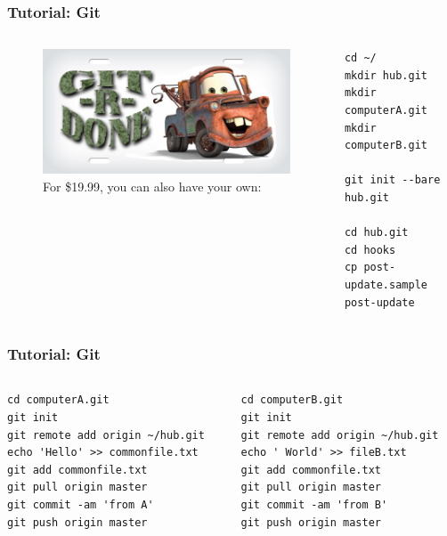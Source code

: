 \begin{frame}[fragile]
    \frametitle{Tutorial: Git}
    \begin{columns}
        \begin{column}{0.4\textwidth}
            \begin{figure}
                \caption{For \$19.99, you can also have your own:}
                \begin{center}
                    \includegraphics[width=\textwidth]{images/gitrdone.jpg}
                \end{center}
            \end{figure}
        \end{column}
        \begin{column}{0.6\textwidth}
\begin{lstlisting}
cd ~/
mkdir hub.git
mkdir computerA.git
mkdir computerB.git

git init --bare hub.git

cd hub.git
cd hooks
cp post-update.sample post-update
\end{lstlisting}
        \end{column}
    \end{columns} 
\end{frame}

\begin{frame}[fragile]
    \frametitle{Tutorial: Git}
    \begin{columns}
        \begin{column}{0.5\textwidth}
\begin{lstlisting}
cd computerA.git
git init 
git remote add origin ~/hub.git
echo 'Hello' >> commonfile.txt
git add commonfile.txt 
git pull origin master
git commit -am 'from A'
git push origin master
\end{lstlisting}
        \end{column}
        \begin{column}{0.5\textwidth}
\begin{lstlisting}
cd computerB.git
git init 
git remote add origin ~/hub.git
echo ' World' >> fileB.txt
git add commonfile.txt 
git pull origin master
git commit -am 'from B'
git push origin master
\end{lstlisting}
        \end{column}
    \end{columns} 
\end{frame}



